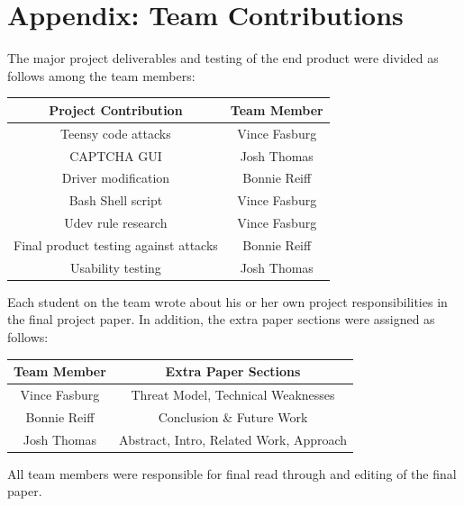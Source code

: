\documentclass[pagenumbers]{ieee}
\begin{document}

\appendix 


\section{Appendix: Team Contributions}

The major project deliverables and testing of the end product were divided as follows among the team members:

\begin{center}
	\begin{tabular}{ | c | c | }
		\hline \textbf{Project Contribution} & \textbf{Team Member} \\ \hline
		Teensy code attacks & Vince Fasburg \\ \hline
		CAPTCHA GUI & Josh Thomas \\ \hline
		Driver modification & Bonnie Reiff \\ \hline
		Bash Shell script & Vince Fasburg \\ \hline
		Udev rule research & Vince Fasburg \\ \hline
		Final product testing against attacks & Bonnie Reiff \\ \hline
		Usability testing & Josh Thomas \\ \hline
	\end{tabular}
\end{center}

Each student on the team wrote about his or her own project responsibilities in the final project paper. In addition, the extra paper sections were assigned as follows:

\begin{center}
	\begin{tabular}{ | c | c | }
		\hline \textbf{Team Member} & \textbf{Extra Paper Sections} \\ \hline
		Vince Fasburg & Threat Model, Technical Weaknesses \\ \hline
		Bonnie Reiff &  Conclusion \& Future Work \\ \hline
		Josh Thomas & Abstract, Intro, Related Work, Approach  \\ \hline
	\end{tabular}
\end{center}

 All team members were responsible for final read through and editing of the final paper.




\end{document}
